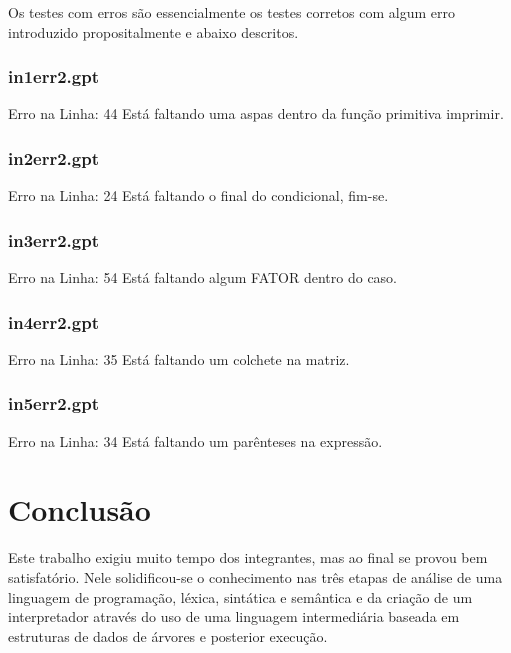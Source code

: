 \documentclass[a4paper,12pt]{report}
\begin{document}
Os testes com erros s\~ao essencialmente os testes corretos com algum erro 
introduzido propositalmente e abaixo descritos.

\subsubsection{in1err2.gpt}

Erro na Linha: 44
Est\'a faltando uma aspas dentro da fun\c{c}\~ao primitiva imprimir.

\subsubsection{in2err2.gpt}

Erro na Linha: 24
Est\'a faltando o final do condicional, fim-se.

\subsubsection{in3err2.gpt}

Erro na Linha: 54
Est\'a faltando algum FATOR dentro do caso.

\subsubsection{in4err2.gpt}

Erro na Linha: 35
Est\'a faltando um colchete na matriz.

\subsubsection{in5err2.gpt}

Erro na Linha: 34
Est\'a faltando um par\^enteses na express\~ao.

\section{Conclus\~ao}

Este trabalho exigiu muito tempo dos integrantes, mas ao final se provou bem satisfat\'orio. Nele solidificou-se o conhecimento nas tr\^es etapas de an\'alise de uma linguagem de programa\c{c}\~ao, l\'exica, sint\'atica e sem\^antica e da cria\c{c}\~ao de um interpretador atrav\'es do uso de uma linguagem intermedi\'aria baseada em estruturas de dados de \'arvores e posterior execu\c{c}\~ao. 
\end{document}
